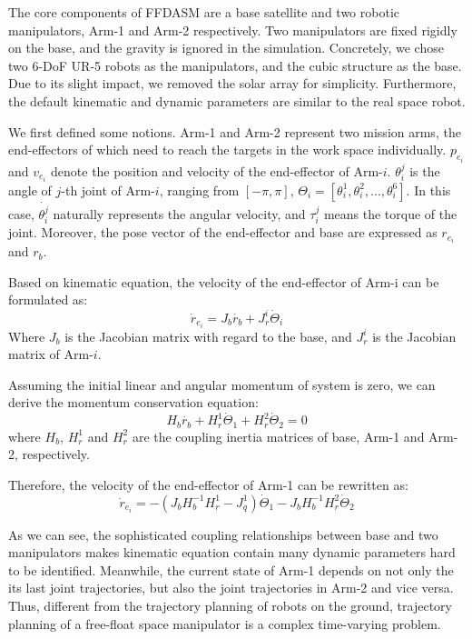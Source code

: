 \documentclass{article}
\begin{document}
The core components of FFDASM are a base satellite and two robotic manipulators, Arm-1 and Arm-2 respectively. Two manipulators are fixed rigidly on the base, and the gravity is ignored in the simulation. Concretely, we chose two 6-DoF UR-5 robots as the manipulators, and the cubic structure as the base. Due to its slight impact, we removed the solar array for simplicity. Furthermore, the default kinematic and dynamic parameters are similar to the real space robot.

We first defined some notions. Arm-1 and Arm-2 represent two mission arms, the end-effectors of which need to reach the targets in the work space individually. $p_{e_i}$ and $v_{e_i}$ denote the position and velocity of the end-effector of Arm-$i$. $\theta^j_i$  is the angle of $j$-th joint of Arm-$i$, ranging from $[-\pi,\pi]$, $\Theta_i = [\theta^1_i,\theta^2_i,...,\theta^6_i]$. In this case, $\dot{\theta^j_i}$  naturally represents the angular velocity, and $\tau^j_i$ means the torque of the joint. Moreover, the pose vector of the end-effector and base are expressed as ${r}_{e_i}$and $r_b$.

Based on kinematic equation, the velocity of the end-effector of Arm-i can be formulated as:
\begin{equation}
  \label{eq2}
\dot {r}_{e_i} =J_{b}\dot {r_{b}}+J^i_{r} \dot{\Theta}_{i}
\end{equation}
Where $J_b$ is the Jacobian matrix with regard to the base, and $J^i_r$ is the Jacobian matrix of Arm-$i$.


Assuming the initial linear and angular momentum of system is zero, we can derive the momentum conservation equation:
\begin{equation}
  \label{eq3}
H_{b}\dot {r_{b}}+H^1_{r} \dot{\Theta}_{1}+ H^2_{r} \dot{\Theta}_{2}=0
\end{equation}
where $H_b$, $H^1_r$ and $H^2_r$ are the coupling inertia matrices of base, Arm-1 and Arm-2, respectively. 

Therefore, the velocity of the end-effector of Arm-1 can be rewritten as:
\begin{equation}
  \label{eq31}
\dot {r}_{e_i}=-(J_{b} H_{b}^{-1} H^1_{r}-J^1_{q}) \dot{\Theta}_{1}-J_{b} H_{b}^{-1} H^2_r \dot{\Theta}_{2}
\end{equation}

As we can see, the sophisticated coupling relationships between base and two manipulators makes kinematic equation contain many dynamic parameters hard to be identified. Meanwhile, the current state of Arm-1 depends on not only the its last joint trajectories, but also the joint trajectories in Arm-2 and vice versa. Thus, different from the trajectory planning of robots on the ground, trajectory planning of a free-float space manipulator is a complex time-varying problem. 
\end{document}
